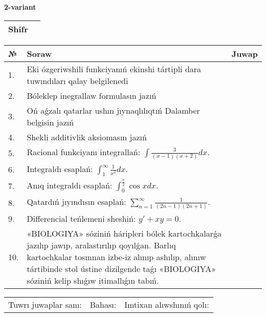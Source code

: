 \documentclass{article}
\begin{document}
  \egroup
  
  \newpage
  
  
  \textbf{2-variant}\\
  
  \bgroup
  \def\arraystretch{1.6} %
  
  \begin{tabular}{|m{5.7cm}|m{9.5cm}|}
  \hline
  Shifr & \\
  \hline
  \end{tabular}
  
  \vspace{1cm}
  
  \begin{tabular}{|m{0.7cm}|m{10cm}|m{4cm}|}
  \hline
  № & Soraw & Juwap \\
  \hline
  1. & Eki ózgeriwshili funkciyanıń ekinshi tártipli dara tuwındıları qalay belgilenedi &  \\
  \hline
  2. & Bóleklep inegrallaw formulasın jazıń &  \\
  \hline
  3. & Oń aǵzalı qatarlar ushın jıynaqlılıqtıń Dalamber belgisin jazıń &  \\
  \hline
  4. & Shekli additivlik aksiomasın jazıń &  \\
  \hline
  5. & Racional funkciyanı integrallań: \(\int{\frac{3}{(x - 1)(x + 2)}dx}\). &  \\
  \hline
  6. & Integraldı esaplań: \(\int_{1}^{\infty}{\frac{1}{x^2 }dx}\). &  \\
  \hline
  7. & Anıq integraldı esaplań: \(\int_{0}^{\frac{\pi}{2}}{\cos xdx}\). &  \\
  \hline
  8. & Qatardıń jıyındısın esaplań: \(\sum_{n = 1}^{\infty}\frac{1}{(2n - 1)(2n + 1)}\). &  \\
  \hline
  9. & Differencial teńlemeni sheshiń: \(y' + xy = 0\). &  \\
  \hline
  10. & «BIOLOGIYA» sóziniń háripleri bólek kartochkalarǵa jazılıp jawıp, aralastırılıp qoyılǵan. Barlıq kartochkalar tosınnan izbe-iz alınıp ashılıp, alınıw tártibinde stol ústine dizilgende taǵı «BIOLOGIYA» sóziniń kelip shıǵıw itimallıǵın tabıń. &  \\
  \hline
  \end{tabular}
  
  \vspace{1cm}
  
  \begin{tabular}{lll}
  Tuwrı juwaplar sanı: \underline{\hspace{1.5cm}} & 
  Bahası: \underline{\hspace{1.5cm}} & 
  Imtixan alıwshınıń qolı: \underline{\hspace{2cm}} \\
  \end{tabular}
  
\end{document}
